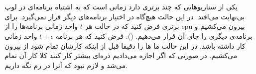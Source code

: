~\\\\
یکی از سناریو‌هایی که چند
برتری دارد زمانی است که به اشتباه برنامه‌ای در لوپ بی‌نهایت می‌افتد. در این حالت هیچ‌گاه
در اختیار برنامه‌های دیگر قرار نمی‌گیرد.
برای برتری
فرض کنید که در حالت
هر
$t$
واحد زمانی برنامه‌ها را از
cpu
بیرون می‌کشیم و برنامه‌ی دیگری را جای آن قرار می‌دهیم.
().
فرض کنید که هر برنامه
$t+\epsilon$
واحد زمانی کار داشته باشد. در این حالت ما
ها
را دقیقا قبل از اینکه کارشان تمام شود از
بیرون می‌کشیم. در صورتی که اگر اجازه می‌دادیم ذره‌ای بیشتر کار کنند کلا کار آن تمام می‌شد و لازم نبود که
آنرا در رم نگه داریم.